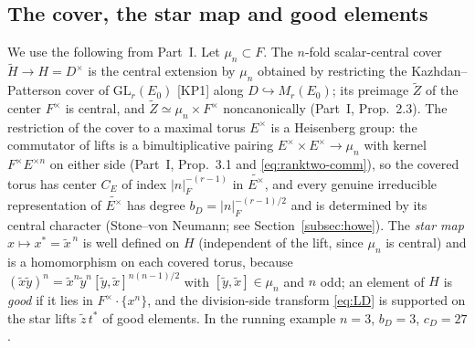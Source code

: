 \documentclass[11pt]{article}
\newcommand{\tH}{\widetilde H}
\newcommand{\tZ}{\widetilde Z}
\theoremstyle{plain}
\theoremstyle{definition}
\begin{document}
\subsection{The cover, the star map and good elements}\label{subsec:coverbackground}
We use the following from Part~I.  Let $\mu_n\subset F$.  The
$n$-fold scalar-central cover $\tH\to H=D^\times$ is the central
extension by $\mu_n$ obtained by restricting the Kazhdan--Patterson cover
of $\mathrm{GL}_r(E_0)$ [KP1] along $D\hookrightarrow M_r(E_0)$; its
preimage $\tZ$ of the center $F^\times$ is central, and
$\tZ\simeq\mu_n\times F^\times$ noncanonically (Part~I, Prop.~2.3).  The
restriction of the cover to a maximal torus $E^\times$ is a Heisenberg
group: the commutator of lifts is a bimultiplicative pairing
$E^\times\times E^\times\to\mu_n$ with kernel $F^\times E^{\times n}$ on
either side (Part~I, Prop.~3.1 and \eqref{eq:ranktwo-comm}), so the
covered torus has center $C_E$ of index $|n|_F^{-(r-1)}$ in
$\widetilde{E^\times}$, and every genuine irreducible representation of
$\widetilde{E^\times}$ has degree $b_D=|n|_F^{-(r-1)/2}$ and is determined
by its central character (Stone--von Neumann; see
Section~\ref{subsec:howe}).  The \emph{star map} $x\mapsto x^*=\tilde x^{\,n}$
is well defined on $H$ (independent of the lift, since $\mu_n$ is
central) and is a homomorphism on each covered torus, because
$(\tilde x\tilde y)^n=\tilde x^n\tilde y^n[\tilde y,\tilde x]^{n(n-1)/2}$
with $[\tilde y,\tilde x]\in\mu_n$ and $n$ odd; an element of $H$ is \emph{good} if it
lies in $F^\times\cdot\{x^n\}$, and the division-side transform
\eqref{eq:LD} is supported on the star lifts $\tilde z\,t^*$ of good
elements.  In the running example $n=3$, $b_D=3$, $c_D=27$.
\end{document}
